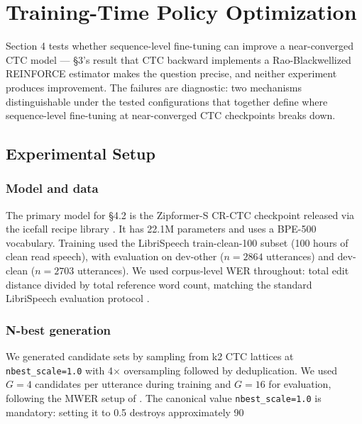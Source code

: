 \section{Training-Time Policy Optimization}
\label{sec:training}

Section 4 tests whether sequence-level fine-tuning can improve a near-converged CTC model — §3's result that CTC backward implements a Rao-Blackwellized REINFORCE estimator makes the question precise, and neither experiment produces improvement. The failures are diagnostic: two mechanisms distinguishable under the tested configurations that together define where sequence-level fine-tuning at near-converged CTC checkpoints breaks down.



\subsection{Experimental Setup}

\subsubsection{Model and data}

The primary model for §4.2 is the Zipformer-S CR-CTC checkpoint \cite{yao2024zipformer, huang2024crctc} released via the icefall recipe library \cite{li2022k2}. It has 22.1M parameters and uses a BPE-500 vocabulary. Training used the LibriSpeech train-clean-100 subset \cite{panayotov2015librispeech} (100 hours of clean read speech), with evaluation on dev-other ($n = 2864$ utterances) and dev-clean ($n = 2703$ utterances). We used corpus-level WER throughout: total edit distance divided by total reference word count, matching the standard LibriSpeech evaluation protocol \cite{panayotov2015librispeech}.

\subsubsection{N-best generation}

We generated candidate sets by sampling from k2 CTC lattices at \texttt{nbest\_scale=1.0} with 4$\times$ oversampling followed by deduplication. We used $G = 4$ candidates per utterance during training and $G = 16$ for evaluation, following the MWER setup of \citet{prabhavalkar2018mwer}. The canonical value \texttt{nbest\_scale=1.0} is mandatory: setting it to 0.5 destroys approximately 90%

